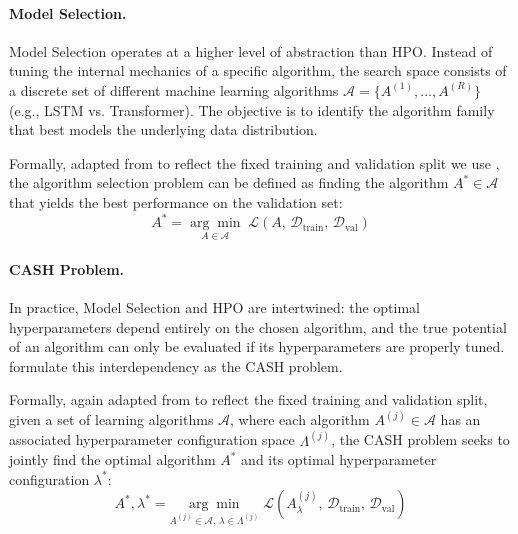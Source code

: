 \paragraph{Model Selection.}
Model Selection operates at a higher level of abstraction than \ac{HPO}. Instead of tuning the internal mechanics of a specific algorithm, the search space consists of a discrete set of different machine learning algorithms $\mathcal{A} = \{A^{(1)}, \dots, A^{(R)}\}$ (e.g., \ac{LSTM} vs. Transformer). The objective is to identify the algorithm family that best models the underlying data distribution. 


Formally, adapted from \textcite{AutoMLHoos} to reflect the fixed training and validation split we use%
, the algorithm selection problem can be defined as finding the algorithm $A^* \in \mathcal{A}$ that yields the best performance on the validation set:
\begin{equation*}
    A^* = \underset{A \in \mathcal{A}}{\arg\min}\;
    \mathcal{L}\!\left(A,\, \mathcal{D}_\text{train},\,
    \mathcal{D}_\text{val}\right)
    \label{eq:model_selection}
\end{equation*}

\paragraph{CASH Problem.}
In practice, Model Selection and \ac{HPO} are intertwined: the optimal hyperparameters depend entirely on the chosen algorithm, and the true potential of an algorithm can only be evaluated if its hyperparameters are properly tuned. \textcite{hutter2019automated} formulate this interdependency as the \acf{CASH} problem.%

Formally, again adapted from \textcite{AutoMLHoos} to reflect the fixed training and validation split, given a set of learning algorithms $\mathcal{A}$, where each algorithm $A^{(j)} \in \mathcal{A}$ has an associated hyperparameter configuration space $\Lambda^{(j)}$, the \ac{CASH} problem seeks to jointly find the optimal algorithm $A^*$ and its optimal hyperparameter configuration $\lambda^*$:%
\begin{equation*}
    A^*, \lambda^* = \underset{A^{(j)} \in \mathcal{A},\, \lambda \in \Lambda^{(j)}}{\arg\min}\;
    \mathcal{L}\!\left(A^{(j)}_\lambda,\, \mathcal{D}_\text{train},\,
    \mathcal{D}_\text{val}\right)
    \label{eq:cash}
\end{equation*}

